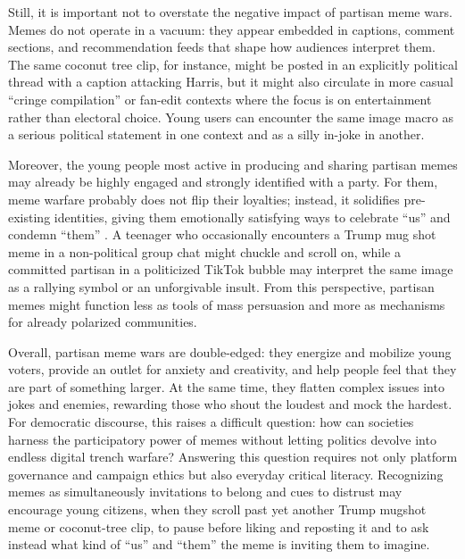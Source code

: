 \documentclass[12pt,twoside]{article}
\begin{document}

Still, it is important not to overstate the negative impact of partisan meme wars. Memes do not operate in a vacuum: they appear embedded in captions, comment sections, and recommendation feeds that shape how audiences interpret them. The same coconut tree clip, for instance, might be posted in an explicitly political thread with a caption attacking Harris, but it might also circulate in more casual ``cringe compilation'' or fan-edit contexts where the focus is on entertainment rather than electoral choice. Young users can encounter the same image macro as a serious political statement in one context and as a silly in-joke in another.

Moreover, the young people most active in producing and sharing partisan memes may already be highly engaged and strongly identified with a party. For them, meme warfare probably does not flip their loyalties; instead, it solidifies pre-existing identities, giving them emotionally satisfying ways to celebrate ``us'' and condemn ``them'' \parencite{galipeau2023impactpoliticalmemes}. A teenager who occasionally encounters a Trump mug shot meme in a non-political group chat might chuckle and scroll on, while a committed partisan in a politicized TikTok bubble may interpret the same image as a rallying symbol or an unforgivable insult. From this perspective, partisan memes might function less as tools of mass persuasion and more as mechanisms for already polarized communities.


Overall, partisan meme wars are double-edged: they energize and mobilize young voters, provide an outlet for anxiety and creativity, and help people feel that they are part of something larger. At the same time, they flatten complex issues into jokes and enemies, rewarding those who shout the loudest and mock the hardest. For democratic discourse, this raises a difficult question: how can societies harness the participatory power of memes without letting politics devolve into endless digital trench warfare? Answering this question requires not only platform governance and campaign ethics but also everyday critical literacy. Recognizing memes as simultaneously invitations to belong and cues to distrust may encourage young citizens, when they scroll past yet another Trump mugshot meme or coconut-tree clip, to pause before liking and reposting it and to ask instead what kind of ``us'' and ``them'' the meme is inviting them to imagine.
\end{document}
